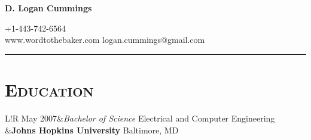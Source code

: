 \documentclass[10pt, letterpaper]{article}
\newcommand\VRule{\color{lightgray}\vrule width 0.5pt}
\begin{document}
\centerline{\Large\bf D. Logan Cummings}
\hfill +1-443-742-6564 \\
www.wordtothebaker.com \hfill logan.cummings@gmail.com
\vspace{1em}
\hrule height 1pt


\section*{\textbf{\textsc{Education}}} 
\begin{tabular}{L!{\VRule}R}
  May 2007&{\sl Bachelor of Science}  \hfill Electrical and Computer Engineering \\
          &\textbf{Johns Hopkins University}  \hfill Baltimore, MD \\
\end{tabular}
\end{document}

